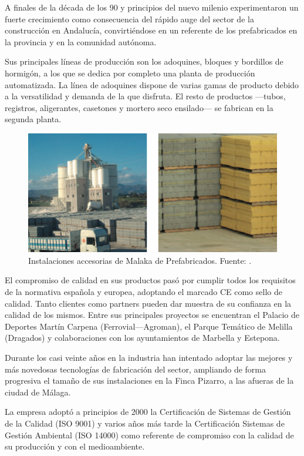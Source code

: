 A finales de la década de los 90 y principios del nuevo milenio experimentaron un fuerte crecimiento como consecuencia del rápido auge del sector de la construcción en Andalucía, convirtiéndose en un referente de los prefabricados en la provincia y en la comunidad autónoma.

Sus principales líneas de producción son los adoquines, bloques y bordillos de hormigón, a los que se dedica por completo una planta de producción automatizada. La línea de adoquines dispone de varias gamas de producto debido a la versatilidad y demanda de la que disfruta. El resto de productos —tubos, registros, aligerantes, casetones y mortero seco ensilado— se fabrican en la segunda planta.

\begin{figure}[!htb]
\centering
\includegraphics[width=15cm]{malaka2.png}
\caption[Instalaciones accesorias de Malaka de Prefabricados.]{Instalaciones accesorias de Malaka de Prefabricados. Fuente: \protect\cite{malakacatalogo}.}
\label{fig:malakainstalaciones2}
\end{figure}

El compromiso de calidad en sus productos pasó por cumplir todos los requisitos de la normativa española y europea, adoptando el marcado CE como sello de calidad. Tanto clientes como partners pueden dar muestra de su confianza en la calidad de los mismos. Entre sus principales proyectos se encuentran el Palacio de Deportes Martín Carpena (Ferrovial—Agroman), el Parque Temático de Melilla (Dragados) y colaboraciones con los ayuntamientos de Marbella y Estepona.

Durante los casi veinte años en la industria han intentado adoptar las mejores y más novedosas tecnologías de fabricación del sector, ampliando de forma progresiva el tamaño de sus instalaciones en la Finca Pizarro, a las afueras de la ciudad de Málaga.

La empresa adoptó a principios de 2000 la Certificación de Sistemas de Gestión de la Calidad (ISO 9001) y varios años más tarde la Certificación Sistemas de Gestión Ambiental (ISO 14000) como referente de compromiso con la calidad de su producción y con el medioambiente.

